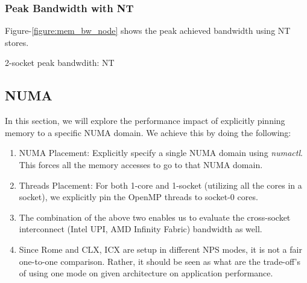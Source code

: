 \documentclass{article}
\begin{document}
\subsubsection{Peak Bandwidth with NT}
Figure-\ref{figure:mem_bw_node} shows the peak achieved bandwidth using NT stores.
\begin{table}[h!]
\centering

\caption{2-socket peak bandwdith: NT}
\label{table:mem_bw_node_nt}
\end{table}



\subsection{NUMA}
In this section, we will explore the performance impact of explicitly pinning memory to a specific NUMA domain. We achieve this by doing the following: 
\begin{enumerate}
\item NUMA Placement: Explicitly specify a single NUMA domain using \textit{numactl}. This forces all the memory accesses to go to that NUMA domain.
\item Threads Placement: For both 1-core and 1-socket (utilizing all the cores in a socket), we explicitly pin the OpenMP threads to socket-0 cores. 
\item The combination of the above two enables us to evaluate the cross-socket interconnect (Intel UPI, AMD Infinity Fabric) bandwidth as well.
\item Since Rome and CLX, ICX are setup in different NPS modes, it is not a fair one-to-one comparison. Rather, it should be seen as what are the trade-off's of using one mode on given architecture on application performance.
\end{enumerate}
\end{document}
